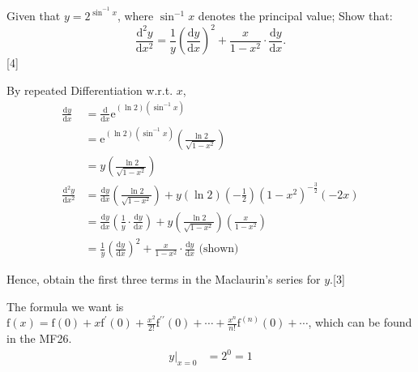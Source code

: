 \documentclass[12pt, a4 paper]{article}
\begin{document}
\begin{outline}[enumerate]
 \1 Given that \(y=2^{\sin^{-1}{x}}\), where \(\sin^{-1}{x}\) denotes the principal value;
 \2 Show that:
 \begin{equation*}
  \dfrac{\mathrm{d}^2y}{\mathrm{d}x^2}=\dfrac{1}{y}{\left(\dfrac{\mathrm{d}y}{\mathrm{d}x}\right)}^2+\dfrac{x}{1-x^2}\cdot \dfrac{\mathrm{d}y}{\mathrm{d}x}.
 \end{equation*}\hfill[4]
 \begin{answer}
  By repeated Differentiation w.r.t. \(x\),
  \begin{align*}
   \frac{\mathrm{d}y}{\mathrm{d}x}     & =\frac{\mathrm{d}}{\mathrm{d}x}\mathrm{e}^{(\ln{2})(\sin^{-1}{x})}                                                                                                    \\
                                       & = \mathrm{e}^{(\ln{2})(\sin^{-1}{x})}\left(\frac{\ln{2}}{\sqrt{1-x^2}}\right)                                                                                         \\
                                       & = y\left(\frac{\ln{2}}{\sqrt{1-x^2}}\right)                                                                                                                           \\
   \frac{\mathrm{d}^2y}{\mathrm{d}x^2} & = \frac{\mathrm{d}y}{\mathrm{d}x}\left(\frac{\ln{2}}{\sqrt{1-x^2}}\right) + y(\ln{2})\left(-\frac{1}{2}\right){(1-x^2)}^{-\frac{3}{2}}(-2x)                           \\
                                       & = \frac{\mathrm{d}y}{\mathrm{d}x}\left(\frac{1}{y}\cdot\frac{\mathrm{d}y}{\mathrm{d}x}\right) + y\left(\frac{\ln{2}}{\sqrt{1-x^2}}\right)\left(\frac{x}{1-x^2}\right) \\
                                       & = \frac{1}{y}{\left(\frac{\mathrm{d}y}{\mathrm{d}x}\right)}^2+\frac{x}{1-x^2}\cdot \frac{\mathrm{d}y}{\mathrm{d}x} \textrm{ (shown)}
  \end{align*}
 \end{answer}
 \2 Hence, obtain the first three terms in the Maclaurin's series for \(y\).\hfill[3] %
 \begin{answer}
  The formula we want is \(\textrm{f}(x)=\textrm{f}(0)+x\textrm{f}^{\prime}(0)+\frac{x^2}{2!}\textrm{f}^{\prime \prime}(0)+\cdots+\frac{x^n}{n!}\textrm{f}^{(n)}(0)+\cdots \), which can be found in the MF26.
  \begin{align*}
   \left.y\right|_{x=0}                                   & =2^0=1                                                \\

\end{align*}
\end{answer}
\end{outline}
\end{document}
